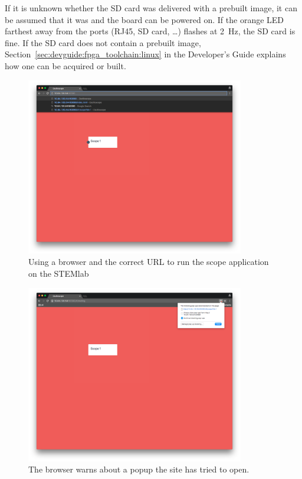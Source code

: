 If it  is unknown  whether the SD  card was delivered  with a  prebuilt image,
it  can  be  assumed  that  it  was  and  the  board  can  be  powered  on. If
the  orange  LED  farthest away  from  the  ports  (RJ45,  SD card,  \ldots  )
flashes  at \SI{2}{\Hz},  the  SD card  is  fine.   If the  SD  card does  not
contain a  prebuilt image,  Section~\ref{sec:devguide:fpga_toolchain:linux} in
the Developer's Guide explains how one can be acquired or built.

\begin{figure}
    \centering
    \includegraphics[width=0.85\textwidth]{images/userguide/url}
    \caption[Entering the URL]{%
        Using a browser and the correct URL to run the scope application on
        the STEMlab%
    }
    \label{fig:userguide:url}
\end{figure}

\begin{figure}
    \centering
    \includegraphics[width=0.85\textwidth]{images/userguide/popup_warn}
    \caption[The popup warn popup]{%
        The browser warns about a popup the site has tried to open.
    }
    \label{fig:userguide:popup:warn}
\end{figure}

